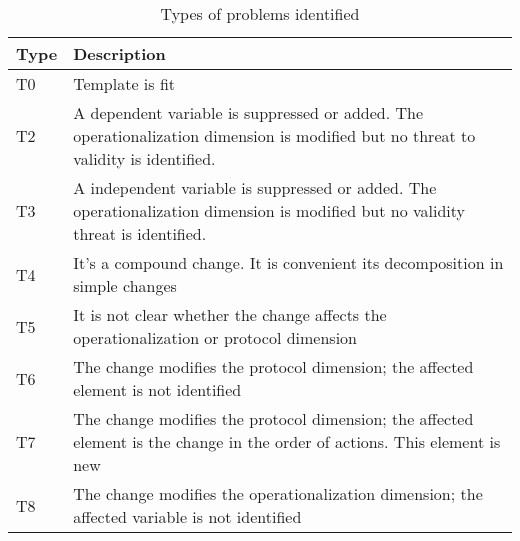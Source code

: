 
\begin{table}

\label{tab:1}       %
\begin{minipage}{6cm}

\begin{tabular}{| l |p{11cm} |}
\hline
\textbf{Type} & \textbf{Description} \\
\hline
T0 & Template is fit \\ \hline
T2 & A dependent variable is suppressed or added.  The operationalization dimension is modified but no threat to validity is identified. \\ \hline
T3 & A independent variable is suppressed or added.  The operationalization dimension is modified but no validity threat is identified. \\ \hline
T4 & It's a compound change. It is convenient its decomposition in simple changes \\ \hline
T5 & It is not clear whether the change affects the operationalization or protocol dimension \\ \hline
T6 & The change modifies the protocol dimension; the affected element is not identified \\ \hline
T7 & The change modifies the protocol dimension; the affected element  is the change in the order of actions. This element is new \\ \hline
T8 & The change modifies the operationalization dimension; the affected variable is not identified
 \\ \hline
 


\end{tabular}
\end{minipage}

\caption{Types of problems identified}
\label{tab:tipos}
\end{table}




